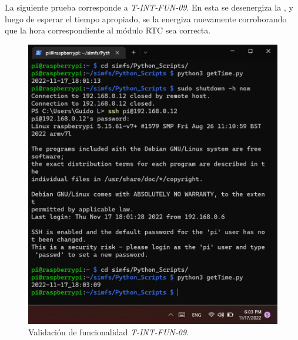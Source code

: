 La siguiente prueba corresponde a \textit{T-INT-FUN-09}. En esta se desenergiza la \rspi, y luego de esperar el tiempo apropiado, se la energiza nuevamente corroborando que la hora correspondiente al módulo RTC sea correcta.
\begin{figure}[H]
\centering
	\includegraphics[width=0.8\linewidth]{ImagenesValidacion del prototipo/TINTFUN9}
	\caption{Validación de funcionalidad \textit{T-INT-FUN-09}.}
\end{figure}

